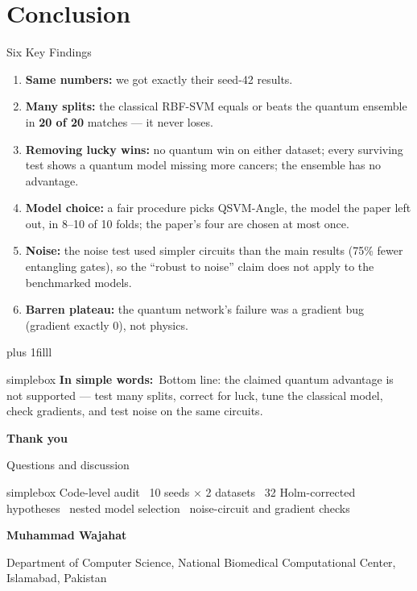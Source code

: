 \documentclass[aspectratio=169,11pt,t,xcolor={table}]{beamer}
\newcommand{\insimple}[1]{%
  \par\vskip 0pt plus 1filll
  \begin{beamercolorbox}[wd=\textwidth,sep=4pt,rounded=true]{simplebox}%
    \small\textbf{\textcolor{qamber!75!black}{In simple words:}}\ #1%
  \end{beamercolorbox}\vskip1pt}
\begin{document}
\section{Conclusion}

\begin{frame}{Six Key Findings}
  \small
  \begin{enumerate}\setlength{\itemsep}{2pt}
    \item \textbf{Same numbers:} we got exactly their seed-42 results.
    \item \textbf{Many splits:} the classical RBF-SVM equals or beats the quantum ensemble in \textbf{20 of 20} matches --- it never loses.
    \item \textbf{Removing lucky wins:} no quantum win on either dataset; every surviving test shows a quantum model missing more cancers; the ensemble has no advantage.
    \item \textbf{Model choice:} a fair procedure picks QSVM-Angle, the model the paper left out, in 8--10 of 10 folds; the paper's four are chosen at most once.
    \item \textbf{Noise:} the noise test used simpler circuits than the main results (75\% fewer entangling gates), so the ``robust to noise'' claim does not apply to the benchmarked models.
    \item \textbf{Barren plateau:} the quantum network's failure was a gradient bug (gradient exactly 0), not physics.
  \end{enumerate}
  \insimple{Bottom line: the claimed quantum advantage is not supported --- test many splits, correct for luck, tune the classical model, check gradients, and test noise on the same circuits.}
\end{frame}





\begin{frame}[c]
  \centering
  {\Huge\bfseries\color{qnavy} Thank you}\par\vspace{3mm}
  {\Large\color{qteal} Questions and discussion}\par\vspace{8mm}
  \begin{beamercolorbox}[wd=0.86\textwidth,sep=6pt,rounded=true,center]{simplebox}
    \small Code-level audit \textbullet\ 10 seeds $\times$ 2 datasets \textbullet\ 32 Holm-corrected hypotheses \textbullet\ nested model selection \textbullet\ noise-circuit and gradient checks
  \end{beamercolorbox}\par\vspace{6mm}
  {\small\bfseries Muhammad Wajahat\par}\vspace{1mm}
  {\footnotesize Department of Computer Science, National Biomedical Computational Center, Islamabad, Pakistan\par}
\end{frame}
\end{document}
